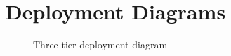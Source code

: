 \documentclass[a4paper]{article}
\begin{document}
\section{Deployment Diagrams}
\begin{figure}[h!]
	\centering
	\caption{Three tier deployment diagram}
\end{figure}
\clearpage
\end{document}
